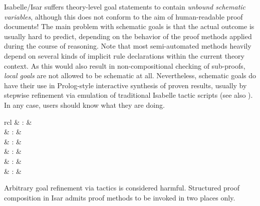 \begin{isabellebody}
\begin{isamarkuptext}
  \begin{warn}
    Isabelle/Isar suffers theory-level goal statements to contain
    \emph{unbound schematic variables}, although this does not conform
    to the aim of human-readable proof documents!  The main problem
    with schematic goals is that the actual outcome is usually hard to
    predict, depending on the behavior of the proof methods applied
    during the course of reasoning.  Note that most semi-automated
    methods heavily depend on several kinds of implicit rule
    declarations within the current theory context.  As this would
    also result in non-compositional checking of sub-proofs,
    \emph{local goals} are not allowed to be schematic at all.
    Nevertheless, schematic goals do have their use in Prolog-style
    interactive synthesis of proven results, usually by stepwise
    refinement via emulation of traditional Isabelle tactic scripts
    (see also ).  In any case, users
    should know what they are doing.
  \end{warn}%
\end{isamarkuptext}%
\isamarkuptrue%
%
\isamarkuptrue%
%
\begin{isamarkuptext}%
\begin{matharray}{rcl}
    \mbox{} & : &  \\
    \mbox{} & : &  \\
    \mbox{} & : &  \\
    \mbox{\isa{\isacommand{{\isachardot}{\isachardot}}}} & : &  \\
    \mbox{\isa{\isacommand{{\isachardot}}}} & : &  \\
    \mbox{} & : &  \\
  \end{matharray}

  Arbitrary goal refinement via tactics is considered harmful.
  Structured proof composition in Isar admits proof methods to be
  invoked in two places only.


\end{isamarkuptext}
\end{isabellebody}
